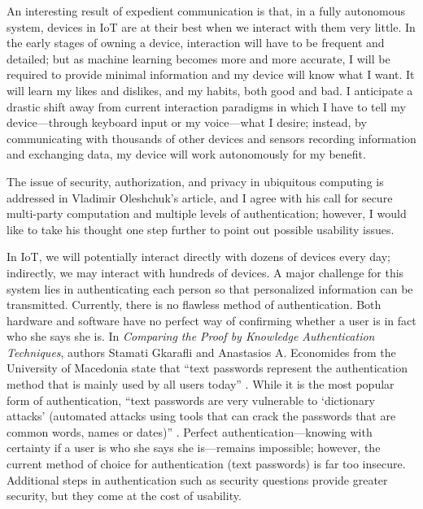 \documentclass[11pt, oneside]{article}   	%
\begin{document}
An interesting result of expedient communication is that, in a fully autonomous system, devices in IoT are at their best when we interact with them very little. In the early stages of owning a device, interaction will have to be frequent and detailed; but as machine learning becomes more and more accurate, I will be required to provide minimal information and my device will know what I want. It will learn my likes and dislikes, and my habits, both good and bad. I anticipate a drastic shift away from current interaction paradigms in which I have to tell my device---through keyboard input or my voice---what I desire; instead, by communicating with thousands of other devices and sensors recording information and exchanging data, my device will work autonomously for my benefit.

The issue of security, authorization, and privacy in ubiquitous computing is addressed in Vladimir Oleshchuk's article, and I agree with his call for secure multi-party computation and multiple levels of authentication; however, I would like to take his thought one step further to point out possible usability issues.

In IoT, we will potentially interact directly with dozens of devices every day; indirectly, we may interact with hundreds of devices. A major challenge for this system lies in authenticating each person so that personalized information can be transmitted. Currently, there is no flawless method of authentication. Both hardware and software have no perfect way of confirming whether a user is in fact who she says she is. In \textit{Comparing the Proof by Knowledge Authentication Techniques}, authors Stamati Gkarafli and Anastasios A. Economides from the University of Macedonia state that ``text passwords represent the authentication method that is mainly used by all users today'' \cite{gkarafli}.  While it is the most popular form of authentication, ``text passwords are very vulnerable to `dictionary attacks' (automated attacks using tools that can crack the passwords that are common words, names or dates)''  \cite{gkarafli}. Perfect authentication---knowing with certainty if a user is who she says she is---remains impossible; however, the current method of choice for authentication (text passwords) is far too insecure. Additional steps in authentication such as security questions provide greater security, but they come at the cost of usability.
\end{document}
